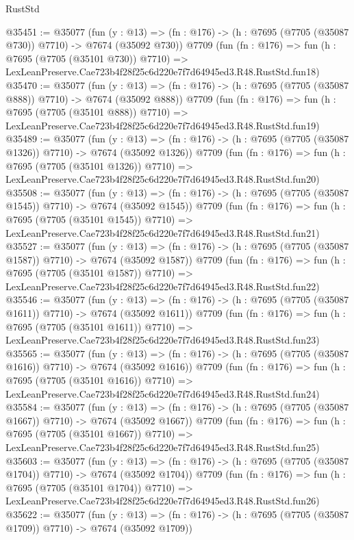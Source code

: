 \begin{lexlean}{RustStd}
\begin{coremodule}
@35451 := @35077
    (fun (y : @13) => (fn : @176) -> (h : @7695 (@7705 (@35087 @730)) @7710) -> @7674 (@35092 @730))
    @7709
    (fun (fn : @176) =>
    fun (h : @7695 (@7705 (@35101 @730)) @7710) =>
    LexLeanPreserve.Cae723b4f28f25c6d220e7f7d64945ed3.R48.RustStd.fun18)
@35470 := @35077
    (fun (y : @13) => (fn : @176) -> (h : @7695 (@7705 (@35087 @888)) @7710) -> @7674 (@35092 @888))
    @7709
    (fun (fn : @176) =>
    fun (h : @7695 (@7705 (@35101 @888)) @7710) =>
    LexLeanPreserve.Cae723b4f28f25c6d220e7f7d64945ed3.R48.RustStd.fun19)
@35489 := @35077
    (fun (y : @13) =>
    (fn : @176) -> (h : @7695 (@7705 (@35087 @1326)) @7710) -> @7674 (@35092 @1326))
    @7709
    (fun (fn : @176) =>
    fun (h : @7695 (@7705 (@35101 @1326)) @7710) =>
    LexLeanPreserve.Cae723b4f28f25c6d220e7f7d64945ed3.R48.RustStd.fun20)
@35508 := @35077
    (fun (y : @13) =>
    (fn : @176) -> (h : @7695 (@7705 (@35087 @1545)) @7710) -> @7674 (@35092 @1545))
    @7709
    (fun (fn : @176) =>
    fun (h : @7695 (@7705 (@35101 @1545)) @7710) =>
    LexLeanPreserve.Cae723b4f28f25c6d220e7f7d64945ed3.R48.RustStd.fun21)
@35527 := @35077
    (fun (y : @13) =>
    (fn : @176) -> (h : @7695 (@7705 (@35087 @1587)) @7710) -> @7674 (@35092 @1587))
    @7709
    (fun (fn : @176) =>
    fun (h : @7695 (@7705 (@35101 @1587)) @7710) =>
    LexLeanPreserve.Cae723b4f28f25c6d220e7f7d64945ed3.R48.RustStd.fun22)
@35546 := @35077
    (fun (y : @13) =>
    (fn : @176) -> (h : @7695 (@7705 (@35087 @1611)) @7710) -> @7674 (@35092 @1611))
    @7709
    (fun (fn : @176) =>
    fun (h : @7695 (@7705 (@35101 @1611)) @7710) =>
    LexLeanPreserve.Cae723b4f28f25c6d220e7f7d64945ed3.R48.RustStd.fun23)
@35565 := @35077
    (fun (y : @13) =>
    (fn : @176) -> (h : @7695 (@7705 (@35087 @1616)) @7710) -> @7674 (@35092 @1616))
    @7709
    (fun (fn : @176) =>
    fun (h : @7695 (@7705 (@35101 @1616)) @7710) =>
    LexLeanPreserve.Cae723b4f28f25c6d220e7f7d64945ed3.R48.RustStd.fun24)
@35584 := @35077
    (fun (y : @13) =>
    (fn : @176) -> (h : @7695 (@7705 (@35087 @1667)) @7710) -> @7674 (@35092 @1667))
    @7709
    (fun (fn : @176) =>
    fun (h : @7695 (@7705 (@35101 @1667)) @7710) =>
    LexLeanPreserve.Cae723b4f28f25c6d220e7f7d64945ed3.R48.RustStd.fun25)
@35603 := @35077
    (fun (y : @13) =>
    (fn : @176) -> (h : @7695 (@7705 (@35087 @1704)) @7710) -> @7674 (@35092 @1704))
    @7709
    (fun (fn : @176) =>
    fun (h : @7695 (@7705 (@35101 @1704)) @7710) =>
    LexLeanPreserve.Cae723b4f28f25c6d220e7f7d64945ed3.R48.RustStd.fun26)
@35622 := @35077
    (fun (y : @13) =>
    (fn : @176) -> (h : @7695 (@7705 (@35087 @1709)) @7710) -> @7674 (@35092 @1709))

\end{coremodule}
\end{lexlean}
